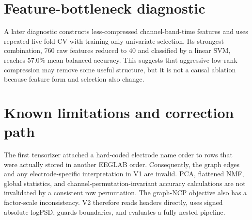 \section{Feature-bottleneck diagnostic}

A later diagnostic constructs less-compressed channel-band-time features and
uses repeated five-fold CV with training-only univariate selection. Its strongest
combination, 760 raw features reduced to 40 and classified by a linear SVM,
reaches 57.0\% mean balanced accuracy. This suggests that aggressive low-rank
compression may remove some useful structure, but it is not a causal ablation
because feature form and selection also change.

\section{Known limitations and correction path}

The first tensorizer attached a hard-coded electrode name order to rows that were
actually stored in another EEGLAB order. Consequently, the graph edges and any
electrode-specific interpretation in V1 are invalid. PCA, flattened NMF, global
statistics, and channel-permutation-invariant accuracy calculations are not
invalidated by a consistent row permutation. The graph-NCP objective also has a
factor-scale inconsistency. V2 therefore reads headers directly, uses signed
absolute logPSD, guards boundaries, and evaluates a fully nested pipeline.

